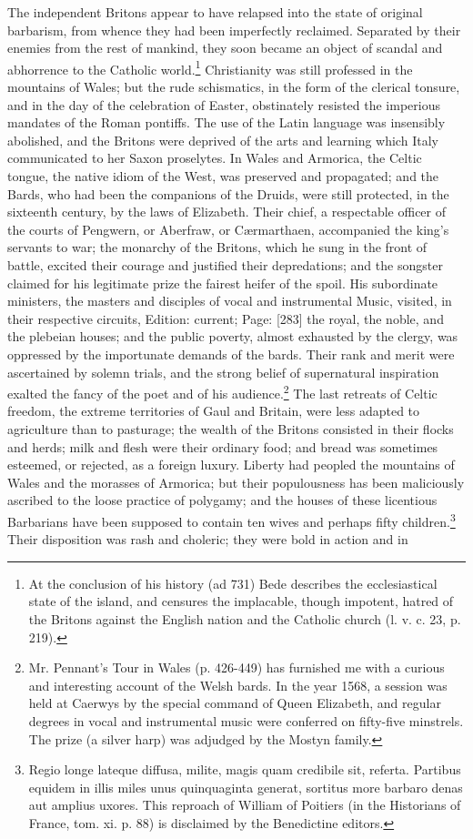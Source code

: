 The independent Britons appear to have relapsed into the state of original barbarism, from whence they had been imperfectly reclaimed. Separated by their enemies from the rest of mankind, they soon became an object of scandal and abhorrence to the Catholic world.\footnote{At the conclusion of his history (ad 731) Bede describes the ecclesiastical state of the island, and censures the implacable, though impotent, hatred of the Britons against the English nation and the Catholic church (l. v. c. 23, p. 219).} Christianity was still professed in the mountains of Wales; but the rude schismatics, in the form of the clerical tonsure, and in the day of the celebration of Easter, obstinately resisted the imperious mandates of the Roman pontiffs. The use of the Latin language was insensibly abolished, and the Britons were deprived of the arts and learning which Italy communicated to her Saxon proselytes. In Wales and Armorica, the Celtic tongue, the native idiom of the West, was preserved and propagated; and the Bards, who had been the companions of the Druids, were still protected, in the sixteenth century, by the laws of Elizabeth. Their chief, a respectable officer of the courts of Pengwern, or Aberfraw, or Cærmarthaen, accompanied the king\texthebrew{}’s servants to war; the monarchy of the Britons, which he sung in the front of battle, excited their courage and justified their depredations; and the songster claimed for his legitimate prize the fairest heifer of the spoil. His subordinate ministers, the masters and disciples of vocal and instrumental Music, visited, in their respective circuits, Edition: current; Page: [283] the royal, the noble, and the plebeian houses; and the public poverty, almost exhausted by the clergy, was oppressed by the importunate demands of the bards. Their rank and merit were ascertained by solemn trials, and the strong belief of supernatural inspiration exalted the fancy of the poet and of his audience.\footnote{Mr. Pennant\texthebrew{}’s Tour in Wales (p. 426-449) has furnished me with a curious and interesting account of the Welsh bards. In the year 1568, a session was held at Caerwys by the special command of Queen Elizabeth, and regular degrees in vocal and instrumental music were conferred on fifty-five minstrels. The prize (a silver harp) was adjudged by the Mostyn family.} The last retreats of Celtic freedom, the extreme territories of Gaul and Britain, were less adapted to agriculture than to pasturage; the wealth of the Britons consisted in their flocks and herds; milk and flesh were their ordinary food; and bread was sometimes esteemed, or rejected, as a foreign luxury. Liberty had peopled the mountains of Wales and the morasses of Armorica; but their populousness has been maliciously ascribed to the loose practice of polygamy; and the houses of these licentious Barbarians have been supposed to contain ten wives and perhaps fifty children.\footnote{Regio longe lateque diffusa, milite, magis quam credibile sit, referta. Partibus equidem in illis miles unus quinquaginta generat, sortitus more barbaro denas aut amplius uxores. This reproach of William of Poitiers (in the Historians of France, tom. xi. p. 88) is disclaimed by the Benedictine editors.} Their disposition was rash and choleric; they were bold in action and in 